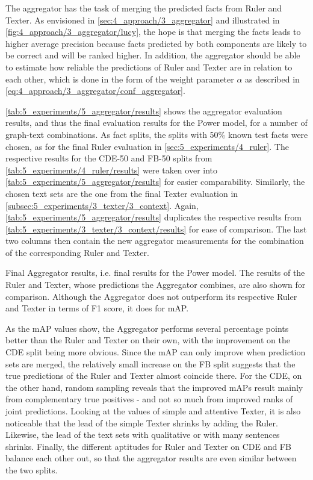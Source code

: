 The aggregator has the task of merging the predicted facts from Ruler and Texter. As envisioned in \autoref{sec:4_approach/3_aggregator} and illustrated in \autoref{fig:4_approach/3_aggregator/lucy}, the hope is that merging the facts leads to higher average precision because facts predicted by both components are likely to be correct and will be ranked higher. In addition, the aggregator should be able to estimate how reliable the predictions of Ruler and Texter are in relation to each other, which is done in the form of the weight parameter $\alpha$ as described in \autoref{eq:4_approach/3_aggregator/conf_aggregator}.

\autoref{tab:5_experiments/5_aggregator/results} shows the aggregator evaluation results, and thus the final evaluation results for the Power model, for a number of graph-text combinations. As fact splits, the splits with 50\% known test facts were chosen, as for the final Ruler evaluation in \autoref{sec:5_experiments/4_ruler}. The respective results for the CDE-50 and FB-50 splits from \autoref{tab:5_experiments/4_ruler/results} were taken over into \autoref{tab:5_experiments/5_aggregator/results} for easier comparability. Similarly, the chosen text sets are the one from the final Texter evaluation in \autoref{subsec:5_experiments/3_texter/3_context}. Again, \autoref{tab:5_experiments/5_aggregator/results} duplicates the respective results from \autoref{tab:5_experiments/3_texter/3_context/results} for ease of comparison. The last two columns then contain the new aggregator measurements for the combination of the corresponding Ruler and Texter.

\begin{table}[h]
    \makebox[\textwidth][c]{
        
    }
    \caption{Final Aggregator results, i.e. final results for the Power model. The results of the Ruler and Texter, whose predictions the Aggregator combines, are also shown for comparison. Although the Aggregator does not outperform its respective Ruler and Texter in terms of F1 score, it does for mAP.}
    \label{tab:5_experiments/5_aggregator/results}
\end{table}

As the mAP values show, the Aggregator performs several percentage points better than the Ruler and Texter on their own, with the improvement on the CDE split being more obvious. Since the mAP can only improve when prediction sets are merged, the relatively small increase on the FB split suggests that the true predictions of the Ruler and Texter almost coincide there. For the CDE, on the other hand, random sampling reveals that the improved mAPs result mainly from complementary true positives - and not so much from improved ranks of joint predictions. Looking at the values of simple and attentive Texter, it is also noticeable that the lead of the simple Texter shrinks by adding the Ruler. Likewise, the lead of the text sets with qualitative or with many sentences shrinks. Finally, the different aptitudes for Ruler and Texter on CDE and FB balance each other out, so that the aggregator results are even similar between the two splits.

